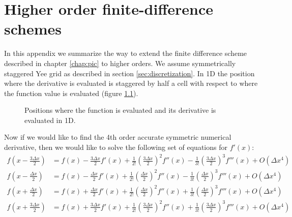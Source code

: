 
\chapter{Higher order finite-difference schemes}
\label{app:finite-diff}

In this appendix we summarize the way to extend the finite difference scheme
described in chapter \ref{chap:pic} to higher orders. We assume symmetrically
staggered Yee grid as described in section \ref{sec:discretization}. In 1D the
position where the derivative is evaluated is staggered by half a cell with
respect to where the function value is evaluated (figure
\ref{fig:finite-diff-pos}).

\begin{figure}[h]
  \centering
  \caption{Positions where the function is evaluated and its derivative is
    evaluated in 1D.}
  \label{fig:finite-diff-pos}
\end{figure}

Now if we would like to find the 4th order accurate symmetric numerical
derivative, then we would like to solve the following set of equations for
$f'(x)$:
\begin{align}
  \label{eq:4th-order-set}
  f \left( x - \frac{3\Delta x}{2} \right) &= f(x) - \frac{3\Delta x}{2}f'(x) + \frac{1}{2!}\left(\frac{3\Delta x}{2}\right)^2f''(x) - \frac{1}{3!}\left( \frac{3\Delta x}{2} \right)^{3}f'''(x) + O(\Delta x^4) \\
  f \left( x - \frac{\Delta x}{2} \right) &= f(x) - \frac{\Delta x}{2}f'(x) + \frac{1}{2!}\left(\frac{\Delta x}{2}\right)^2f''(x) - \frac{1}{3!}\left( \frac{\Delta x}{2} \right)^{3}f'''(x) + O(\Delta x^4) \\
  f \left( x + \frac{\Delta x}{2} \right) &= f(x) + \frac{\Delta x}{2}f'(x) + \frac{1}{2!}\left(\frac{\Delta x}{2}\right)^2f''(x) + \frac{1}{3!}\left( \frac{\Delta x}{2} \right)^{3}f'''(x) + O(\Delta x^4) \\
  f \left( x + \frac{3\Delta x}{2} \right) &= f(x) + \frac{3\Delta x}{2}f'(x) + \frac{1}{2!}\left(\frac{3\Delta x}{2}\right)^2f''(x) + \frac{1}{3!}\left( \frac{3\Delta x}{2} \right)^{3}f'''(x) + O(\Delta x^4)
\end{align}

